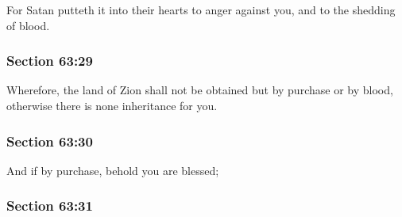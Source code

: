 		For Satan putteth it into their hearts to anger against you, and to the shedding of blood.


	\subsubsection{Section 63:29} %
		\label{DC63-29}

		Wherefore, the land of Zion shall not be obtained but by purchase or by blood, otherwise there is none inheritance for you.


	\subsubsection{Section 63:30} %
		\label{DC63-30}

		And if by purchase, behold you are blessed;


	\subsubsection{Section 63:31} %
		\label{DC63-31}

